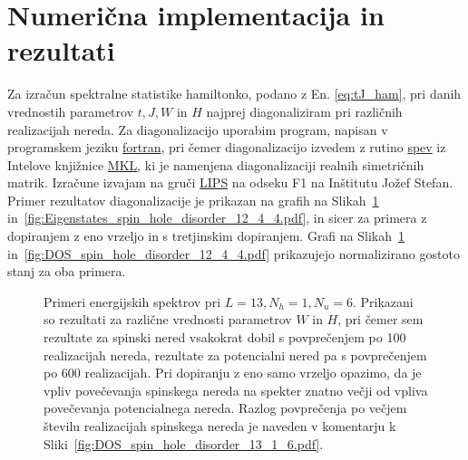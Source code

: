 \documentclass[10pt,a4paper]{article}
\begin{document}
 \section{Numerična implementacija in rezultati}
 Za izračun spektralne statistike hamiltonko, podano z En. \eqref{eq:tJ_ham}, pri danih vrednostih parametrov $t, J, W$ in $H$ najprej diagonaliziram pri različnih realizacijah nereda. Za diagonalizacijo uporabim program, napisan v programskem jeziku \url{fortran}, pri čemer diagonalizacijo izvedem z rutino \url{spev} iz Intelove knjižnice \url{MKL}, ki je namenjena diagonalizaciji realnih simetričnih matrik. Izračune izvajam na gruči \url{LIPS} na odseku F1 na Inštitutu Jožef Stefan. Primer rezultatov diagonalizacije je prikazan na grafih na Slikah~\ref{fig:Eigenstates_spin_hole_disorder_13_1_6.pdf} in~\ref{fig:Eigenstates_spin_hole_disorder_12_4_4.pdf}, in sicer za primera z dopiranjem z eno vrzeljo in s tretjinskim dopiranjem. Grafi na Slikah~\ref{fig:Eigenstates_spin_hole_disorder_13_1_6.pdf} in~\ref{fig:DOS_spin_hole_disorder_12_4_4.pdf} prikazujejo normalizirano gostoto stanj za oba primera. 	
 \begin{figure}[H]
\caption{Primeri energijskih spektrov pri $L=13, N_h=1, N_u=6.$ Prikazani so rezultati za različne vrednosti parametrov $W$ in $H$, pri čemer sem rezultate za spinski nered vsakokrat dobil s povprečenjem po 100 realizacijah nereda, rezultate za potencialni nered pa s povprečenjem po 600 realizacijah. Pri dopiranju z eno samo vrzeljo opazimo, da je vpliv povečevanja spinskega nereda na spekter znatno večji od vpliva povečevanja potencialnega nereda. Razlog povprečenja po večjem številu realizacijah spinskega nereda je naveden v komentarju k Sliki~\ref{fig:DOS_spin_hole_disorder_13_1_6.pdf}.  }
\label{fig:Eigenstates_spin_hole_disorder_13_1_6.pdf}
\end{figure}
\end{document}

